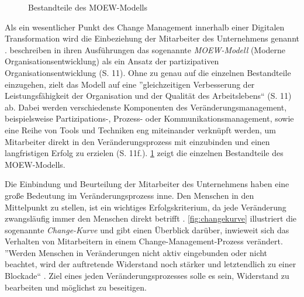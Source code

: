 \begin{figure}[h]
	\centering
	\caption[Bestandteile des MOEW-Modells]{Bestandteile des MOEW-Modells \protect \cite[S. 12]{kaune_change_2016}}
	\label{fig:moew}
\end{figure}

Als ein wesentlicher Punkt des Change Management innerhalb einer Digitalen Transformation wird die Einbeziehung der Mitarbeiter des Unternehmens genannt \cite[S. 179f.]{hess_digitale_2019}.  beschreiben in ihren Ausführungen das sogenannte \textit{MOEW-Modell} (Moderne Organisationsentwicklung) als ein Ansatz der partizipativen Organisationsentwicklung (S. 11). Ohne zu genau auf die einzelnen Bestandteile einzugehen, zielt das Modell auf eine ''gleichzeitigen Verbesserung der Leistungsfähigkeit der Organisation und der Qualität des Arbeitslebens`` (S. 11) ab. Dabei werden verschiedenste Komponenten des Veränderungsmanagement, beispielsweise Partizipations-, Prozess- oder Kommunikationsmanagement, sowie eine Reihe von Tools und Techniken eng miteinander verknüpft werden, um Mitarbeiter direkt in den Veränderungsprozess mit einzubinden und einen langfristigen Erfolg zu erzielen (S. 11f.). \ref{fig:moew} zeigt die einzelnen Bestandteile des MOEW-Modells.

Die Einbindung und Beurteilung der Mitarbeiter des Unternehmens haben eine große Bedeutung im Veränderungsprozess inne. Den Menschen in den Mittelpunkt zu stellen, ist ein wichtiges Erfolgskriterium, da jede Veränderung zwangsläufig immer den Menschen direkt betrifft \cite[S. 3]{bertagnolli_change_2018}. \ref{fig:changekurve} illustriert die sogenannte \textit{Change-Kurve} und gibt einen Überblick darüber, inwieweit sich das Verhalten von Mitarbeitern in einem Change-Management-Prozess verändert. ''Werden Menschen in Veränderungen nicht aktiv eingebunden oder nicht beachtet, wird der auftretende Widerstand noch stärker und letztendlich zu einer Blockade`` \cite[S. 3f.]{bertagnolli_change_2018}. Ziel eines jeden Veränderungsprozesses solle es sein, Widerstand zu bearbeiten und möglichst zu beseitigen. 

